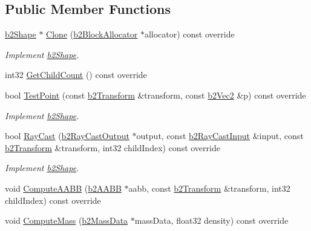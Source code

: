 \subsection*{Public Member Functions}
\begin{DoxyCompactItemize}
\item 
\mbox{\label{classb2_circle_shape_a5ff8fbab7dff87784fbff20b07e55cfc}} 
\hyperlink{classb2_shape}{b2\+Shape} $\ast$ \hyperlink{classb2_circle_shape_a5ff8fbab7dff87784fbff20b07e55cfc}{Clone} (\hyperlink{classb2_block_allocator}{b2\+Block\+Allocator} $\ast$allocator) const override
\begin{DoxyCompactList}\small\item\em Implement \hyperlink{classb2_shape}{b2\+Shape}. \end{DoxyCompactList}\item 
int32 \hyperlink{classb2_circle_shape_a552db3402aed5d12c3177981e5208065}{Get\+Child\+Count} () const override
\item 
\mbox{\label{classb2_circle_shape_a84e22b3807e84b72f2981010fc197099}} 
bool \hyperlink{classb2_circle_shape_a84e22b3807e84b72f2981010fc197099}{Test\+Point} (const \hyperlink{structb2_transform}{b2\+Transform} \&transform, const \hyperlink{structb2_vec2}{b2\+Vec2} \&p) const override
\begin{DoxyCompactList}\small\item\em Implement \hyperlink{classb2_shape}{b2\+Shape}. \end{DoxyCompactList}\item 
\mbox{\label{classb2_circle_shape_a442e847b9fc3d1344b02b48d490eb0c6}} 
bool \hyperlink{classb2_circle_shape_a442e847b9fc3d1344b02b48d490eb0c6}{Ray\+Cast} (\hyperlink{structb2_ray_cast_output}{b2\+Ray\+Cast\+Output} $\ast$output, const \hyperlink{structb2_ray_cast_input}{b2\+Ray\+Cast\+Input} \&input, const \hyperlink{structb2_transform}{b2\+Transform} \&transform, int32 child\+Index) const override
\begin{DoxyCompactList}\small\item\em Implement \hyperlink{classb2_shape}{b2\+Shape}. \end{DoxyCompactList}\item 
void \hyperlink{classb2_circle_shape_af4a4ea78780af7a7ce40bf5d54affe83}{Compute\+A\+A\+BB} (\hyperlink{structb2_a_a_b_b}{b2\+A\+A\+BB} $\ast$aabb, const \hyperlink{structb2_transform}{b2\+Transform} \&transform, int32 child\+Index) const override
\item 
void \hyperlink{classb2_circle_shape_a7dc07891abd015863fbf03076e47eec5}{Compute\+Mass} (\hyperlink{structb2_mass_data}{b2\+Mass\+Data} $\ast$mass\+Data, float32 density) const override
\end{DoxyCompactItemize}
